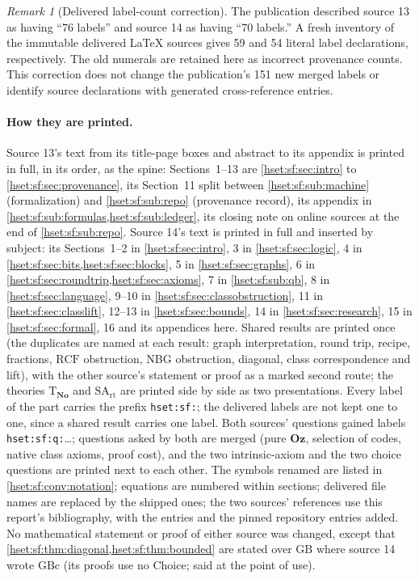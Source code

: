 \documentclass[11pt,letterpaper]{article}
\theoremstyle{definition}
\theoremstyle{remark}
\newtheorem{remark}[remark]{Remark}\aliascntresetthe{remark}
\newcommand{\No}{\mathbf{No}}
\newcommand{\Oz}{\mathbf{Oz}}
\newcommand{\GB}{\mathrm{GB}}
\newcommand{\GBc}{\mathrm{GBc}}
\newcommand{\RCF}{\mathrm{RCF}}
\newcommand{\Tth}{\mathrm{T}}
\newcommand{\SArt}{\mathrm{SA}_{\mathrm{rt}}}
\begin{document}
\begin{remark}[Delivered label-count correction]
\label{hset:sf:rem:delivered-label-counts}
The publication described source 13 as having ``76 labels'' and source 14
as having ``70 labels.'' A fresh inventory of the immutable delivered
\LaTeX{} sources gives 59 and 54 literal label declarations, respectively.
The old numerals are retained here as incorrect provenance counts. This
correction does not change the publication's 151 new merged labels or
identify source declarations with generated cross-reference entries.
\end{remark}

\paragraph{How they are printed.} Source 13's text from its title-page boxes and
abstract to its appendix is printed in full, in its order, as the spine: Sections~1--13
are \cref{hset:sf:sec:intro} to \cref{hset:sf:sec:provenance}, its Section~11 split
between \cref{hset:sf:sub:machine} (formalization) and \cref{hset:sf:sub:repo}
(provenance record), its appendix in \cref{hset:sf:sub:formulas,hset:sf:sub:ledger},
its closing note on online sources at the end of \cref{hset:sf:sub:repo}. Source 14's
text is printed in full and inserted by subject: its Sections~1--2 in
\cref{hset:sf:sec:intro}, 3 in \cref{hset:sf:sec:logic}, 4 in
\cref{hset:sf:sec:bits,hset:sf:sec:blocks}, 5 in \cref{hset:sf:sec:graphs}, 6 in
\cref{hset:sf:sec:roundtrip,hset:sf:sec:axioms}, 7 in \cref{hset:sf:sub:qb}, 8 in
\cref{hset:sf:sec:language}, 9--10 in \cref{hset:sf:sec:classobstruction}, 11 in
\cref{hset:sf:sec:classlift}, 12--13 in \cref{hset:sf:sec:bounds}, 14 in
\cref{hset:sf:sec:research}, 15 in \cref{hset:sf:sec:formal}, 16 and its appendices
here. Shared results are printed once (the duplicates are named at each result:
graph interpretation, round trip, recipe, fractions, $\RCF$ obstruction, NBG
obstruction, diagonal, class correspondence and lift), with the other source's
statement or proof as a marked second route; the theories $\Tth_{\No}$ and $\SArt$
are printed side by side as two presentations. Every label of the part carries the
prefix \texttt{hset:sf:}; the delivered labels are not kept one to one, since a shared
result carries one label. Both sources' questions gained labels
\texttt{hset:sf:q:}\dots; questions asked by both are merged (pure $\Oz$, selection
of codes, native class axioms, proof cost), and the two intrinsic-axiom and the two
choice questions are printed next to each other. The symbols renamed are listed in
\cref{hset:sf:conv:notation}; equations are numbered within sections; delivered file
names are replaced by the shipped ones; the two sources' references use this report's
bibliography, with the entries \cite{FriedmanVisser,FriedmanTarski,KayeWong,WilliamsDiss,WilliamsMin,KKS,EhrlichKaplanII,JerabekOz,Levy,Godel}
and the pinned repository entries added. No mathematical statement or proof of either
source was changed, except that \cref{hset:sf:thm:diagonal,hset:sf:thm:bounded} are
stated over $\GB$ where source 14 wrote $\GBc$ (its proofs use no Choice; said at the
point of use).
\end{document}
